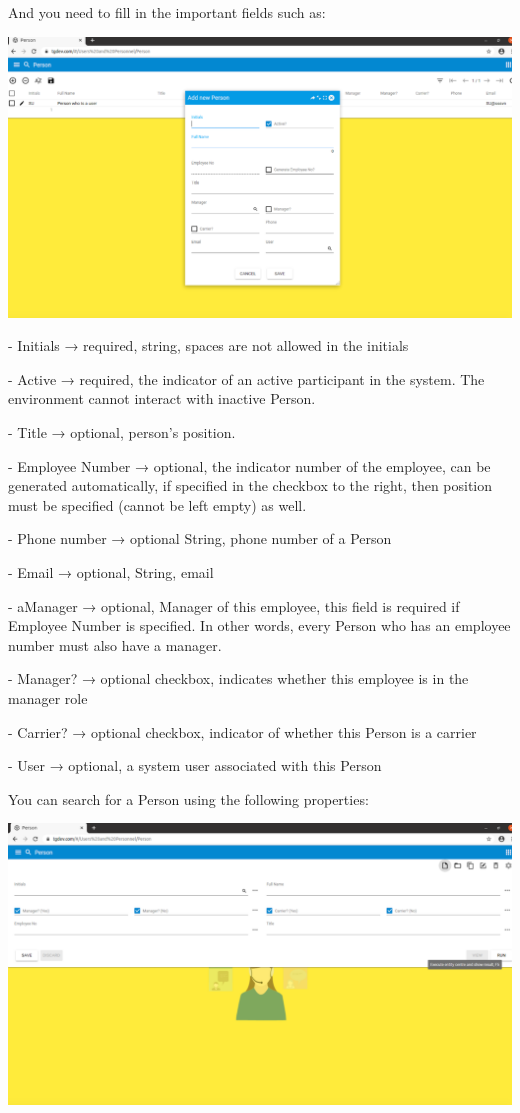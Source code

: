 And you need to  fill in the important fields such as:

\includegraphics[width=\textwidth]{sections/01-chapter/images/person3.png}

- Initials →  required, string, spaces are not allowed in the initials

- Active → required, the indicator of an active participant in the system. The environment cannot interact with inactive Person.

- Title →  optional, person’s position.

- Employee Number → optional, the indicator number of the employee, can be generated automatically, if specified in the checkbox to the right, then position must be specified (cannot be left empty) as well. 

- Phone number → optional String, phone number of a Person

- Email →  optional, String, email

- aManager →  optional, Manager of this employee, this field is required if Employee Number is specified. In other words, every Person who has an employee number must also have a manager.

- Manager? →  optional checkbox, indicates whether this employee is in the manager role

- Carrier? → optional checkbox, indicator of whether this Person is a carrier

- User → optional, a system user associated with this Person

You can search for a Person using the following properties: 

\includegraphics[width=\textwidth]{sections/01-chapter/images/person4.png}

